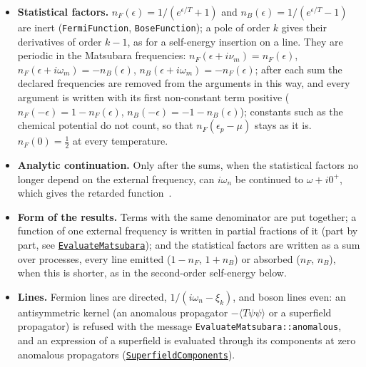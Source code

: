 \documentclass[11pt,a4paper]{article}
\newcommand{\pkg}[1]{\texttt{#1}}
\newcommand{\fnref}[1]{\hyperref[fn:#1]{\pkg{#1}}}
\begin{document}
\begin{itemize}
  \pkg{1} (the default), $G(0^-)=\langle\psi^\dagger\psi\rangle$, the factor $e^{i\omega_n0^+}$ and $n_F(\xi)$; \pkg{-1},
  $G(0^+)=-\langle\psi\psi^\dagger\rangle$, the factor $e^{-i\omega_n0^+}$ and $n_F(\xi)-1$; \pkg{0}, the mean
  $\frac12\langle[\psi^\dagger,\psi]\rangle$, the symmetric sum without a factor and $n_F(\xi)-\frac12$; a boson line,
  even and continuous at $\tau=0$, needs no factor (\fnref{MatsubaraSum} of a boson pole gives $-n_B$, $-n_B-1$ and
  $-n_B-\frac12$). They differ by a constant per state; the symmetric choice is natural on a lattice with a
  particle--hole symmetric interaction, where the difference is a shift of the chemical potential, while in the continuum
  the sum over states of the constant diverges.
\item \textbf{Statistical factors.} $n_F(\epsilon)=1/(e^{\epsilon/T}+1)$ and $n_B(\epsilon)=1/(e^{\epsilon/T}-1)$ are inert
  (\pkg{FermiFunction}, \pkg{BoseFunction}); a pole of order $k$ gives their derivatives of order $k-1$, as for a self-energy
  insertion on a line. They are periodic in the Matsubara frequencies: $n_F(\epsilon+i\nu_m)=n_F(\epsilon)$,
  $n_F(\epsilon+i\omega_m)=-n_B(\epsilon)$, $n_B(\epsilon+i\omega_m)=-n_F(\epsilon)$; after each sum the declared
  frequencies are removed from the arguments in this way, and every argument is written with its first non-constant term
  positive ($n_F(-\epsilon)=1-n_F(\epsilon)$, $n_B(-\epsilon)=-1-n_B(\epsilon)$); constants such as the chemical
  potential do not count, so that $n_F(\epsilon_p-\mu)$ stays as it is. $n_F(0)=\frac12$ at every temperature.
\item \textbf{Analytic continuation.} Only after the sums, when the statistical factors no longer depend on the external
  frequency, can $i\omega_n$ be continued to $\omega+i0^+$, which gives the retarded function~\cite{FetterWalecka}.
\item \textbf{Form of the results.} Terms with the same denominator are put together; a function of one external
  frequency is written in partial fractions of it (part by part, see \fnref{EvaluateMatsubara}); and the statistical
  factors are written as a sum over processes, every line emitted ($1-n_F$, $1+n_B$) or absorbed ($n_F$, $n_B$), when
  this is shorter, as in the second-order self-energy below.
\item \textbf{Lines.} Fermion lines are directed, $1/(i\omega_n-\xi_k)$, and boson lines even: an antisymmetric kernel
  (an anomalous propagator $-\langle T\psi\psi\rangle$ or a superfield propagator) is refused with the message
  \pkg{EvaluateMatsubara::anomalous}, and an expression of a superfield is evaluated through its components at zero
  anomalous propagators (\fnref{SuperfieldComponents}).
\end{itemize}
\end{document}
